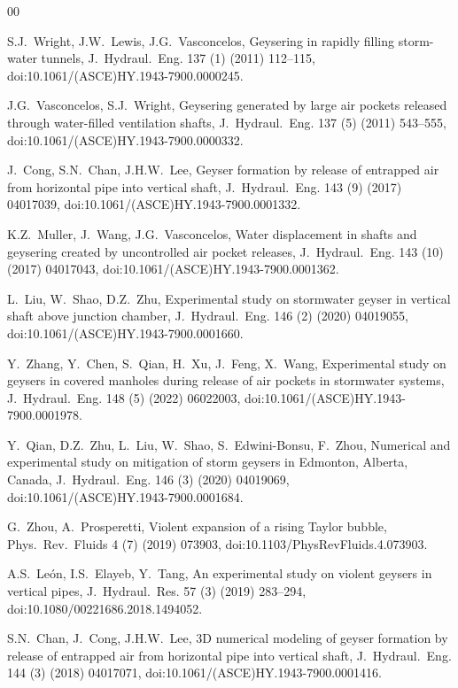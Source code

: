 \begin{thebibliography}{00}

S.J.~Wright, J.W.~Lewis, J.G.~Vasconcelos,
Geysering in rapidly filling storm-water tunnels,
J.~Hydraul.~Eng. 137 (1) (2011) 112--115,
doi:10.1061/(ASCE)HY.1943-7900.0000245.

J.G.~Vasconcelos, S.J.~Wright,
Geysering generated by large air pockets released through water-filled
ventilation shafts,
J.~Hydraul.~Eng. 137 (5) (2011) 543--555,
doi:10.1061/(ASCE)HY.1943-7900.0000332.

J.~Cong, S.N.~Chan, J.H.W.~Lee,
Geyser formation by release of entrapped air from horizontal pipe into
vertical shaft,
J.~Hydraul.~Eng. 143 (9) (2017) 04017039,
doi:10.1061/(ASCE)HY.1943-7900.0001332.

K.Z.~Muller, J.~Wang, J.G.~Vasconcelos,
Water displacement in shafts and geysering created by uncontrolled air
pocket releases,
J.~Hydraul.~Eng. 143 (10) (2017) 04017043,
doi:10.1061/(ASCE)HY.1943-7900.0001362.

L.~Liu, W.~Shao, D.Z.~Zhu,
Experimental study on stormwater geyser in vertical shaft above junction
chamber,
J.~Hydraul.~Eng. 146 (2) (2020) 04019055,
doi:10.1061/(ASCE)HY.1943-7900.0001660.

Y.~Zhang, Y.~Chen, S.~Qian, H.~Xu, J.~Feng, X.~Wang,
Experimental study on geysers in covered manholes during release of air
pockets in stormwater systems,
J.~Hydraul.~Eng. 148 (5) (2022) 06022003,
doi:10.1061/(ASCE)HY.1943-7900.0001978.

Y.~Qian, D.Z.~Zhu, L.~Liu, W.~Shao, S.~Edwini-Bonsu, F.~Zhou,
Numerical and experimental study on mitigation of storm geysers in
Edmonton, Alberta, Canada,
J.~Hydraul.~Eng. 146 (3) (2020) 04019069,
doi:10.1061/(ASCE)HY.1943-7900.0001684.

G.~Zhou, A.~Prosperetti,
Violent expansion of a rising Taylor bubble,
Phys.~Rev.~Fluids 4 (7) (2019) 073903,
doi:10.1103/PhysRevFluids.4.073903.

A.S.~Le\'{o}n, I.S.~Elayeb, Y.~Tang,
An experimental study on violent geysers in vertical pipes,
J.~Hydraul.~Res. 57 (3) (2019) 283--294,
doi:10.1080/00221686.2018.1494052.

S.N.~Chan, J.~Cong, J.H.W.~Lee,
3D numerical modeling of geyser formation by release of entrapped air from
horizontal pipe into vertical shaft,
J.~Hydraul.~Eng. 144 (3) (2018) 04017071,
doi:10.1061/(ASCE)HY.1943-7900.0001416.


\end{thebibliography}
